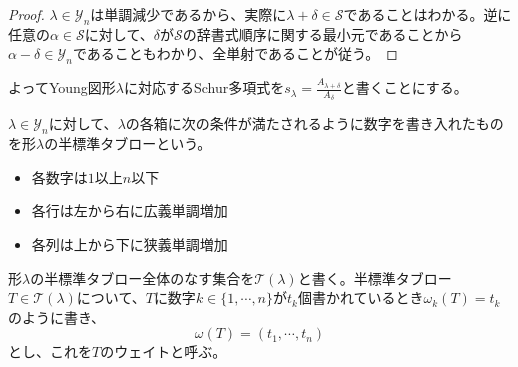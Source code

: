 \documentclass{ltjsreport}
\begin{document}
\begin{proof}
    $\lambda\in\mathcal{Y}_n$は単調減少であるから、実際に$\lambda+\delta\in\mathcal{S}$であることはわかる。逆に任意の$\alpha\in\mathcal{S}$に対して、$\delta$が$\mathcal{S}$の辞書式順序に関する最小元であることから$\alpha-\delta\in\mathcal{Y}_n$であることもわかり、全単射であることが従う。
\end{proof}

よってYoung図形$\lambda$に対応するSchur多項式を$s_\lambda=\frac{A_{\lambda+\delta}}{A_\delta}$と書くことにする。

\begin{defin}
    $\lambda\in\mathcal{Y}_n$に対して、$\lambda$の各箱に次の条件が満たされるように数字を書き入れたものを形$\lambda$の半標準タブローという。
    \begin{itemize}
        \item 各数字は$1$以上$n$以下
        \item 各行は左から右に広義単調増加
        \item 各列は上から下に狭義単調増加
    \end{itemize}
    形$\lambda$の半標準タブロー全体のなす集合を$\mathcal{T}(\lambda)$と書く。半標準タブロー$T\in\mathcal{T}(\lambda)$について、$T$に数字$k\in\{1,\cdots,n\}$が$t_k$個書かれているとき$\omega_k(T)=t_k$のように書き、
    \[
    \omega(T)=(t_1,\cdots,t_n)
    \]
    とし、これを$T$のウェイトと呼ぶ。
\end{defin}
\end{document}
